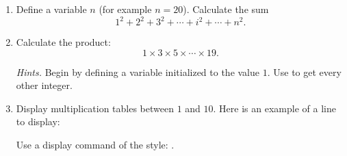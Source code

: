 \documentclass[11pt,class=report,crop=false]{standalone}
\begin{document}

\begin{activite}


\begin{enumerate}
  \item Define a variable $n$ (for example $n=20$). Calculate the sum
  $$1^2+2^2+3^2+\cdots+i^2+\cdots +n^2.$$
  
  \item Calculate the product:
  $$1 \times 3 \times 5 \times \cdots \times 19.$$
  
  \emph{Hints.} Begin by defining a  variable initialized to the value $1$. Use  to get every other integer.
  
  \item Display multiplication tables between $1$ and $10$. Here is an example of a line to display:
  
  Use a display command of the style: .
\end{enumerate}  
\end{activite}
\end{document}
